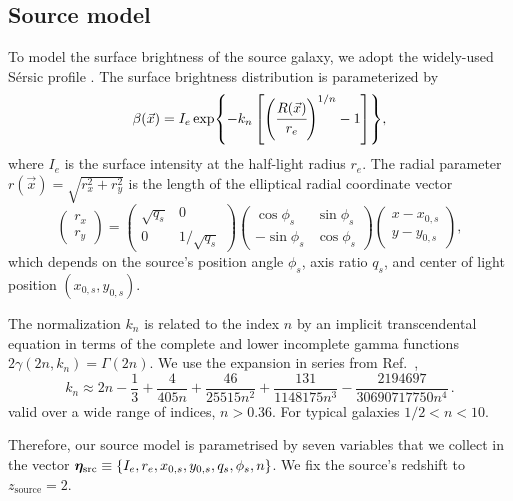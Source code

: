 \subsection{Source model} \label{subsec:source}
To model the surface brightness of the source galaxy, we adopt the widely-used Sérsic profile \cite{Sersic:1963aa}. The surface brightness distribution is parameterized by 
\begin{equation}\label{eq:sersic}
    \beta(\vec{x})=I_e \exp{-k_n\left[\left(\cfrac{R(\vec{x})}{r_e}\right)^{1/n}-1\right]},
\end{equation}
where $I_e$ is the surface intensity at the half-light radius $r_e$. The radial parameter $r(\vec{x})=\sqrt{r_x^2+r_y^2}$ is the length of the elliptical radial coordinate vector
\begin{equation}
    \begin{pmatrix} 
        r_x \\ r_y 
    \end{pmatrix} = 
    \begin{pmatrix} 
      \sqrt{q_s} & 0 \\ 0 & 1/\sqrt{q_s} 
    \end{pmatrix} 
    \begin{pmatrix} 
        \cos\phi_s & \sin\phi_s \\ -\sin\phi_s & \cos\phi_s 
    \end{pmatrix} 
    \begin{pmatrix} 
        x - x_{0,s} \\ y - y_{0,s} 
    \end{pmatrix},
\end{equation}
which depends on the source's position angle $\phi_s$, axis ratio $q_s$, and center of light position $(x_{0,s}, y_{0,s})$. 

The normalization $k_n$ is related to the index $n$ by an implicit transcendental equation in terms of the complete and lower incomplete gamma functions $2\gamma(2n, k_n)=\Gamma(2n)$. We use the expansion in series from Ref.~\cite{Ciotti:1999zs}, 
\begin{equation}
    k_n \approx 2 n - \frac{1}{3} + \frac{4}{405 n} + \frac{46}{25515 n^2} + \frac{131}{1148175 n^3} - \frac{2194697}{30690717750 n^4} \, .
\end{equation}
valid over a wide range of indices, $n>0.36$. For typical galaxies $1/2 < n < 10$.

Therefore, our source model is parametrised by seven variables that we collect in the vector $\bm{\eta}_\mathrm{src} \equiv\{I_e, r_e, x_{0,s}, y_{0,s}, q_s, \phi_s, n\}$. We fix the source's redshift to $z_\mathrm{source} = 2$.

